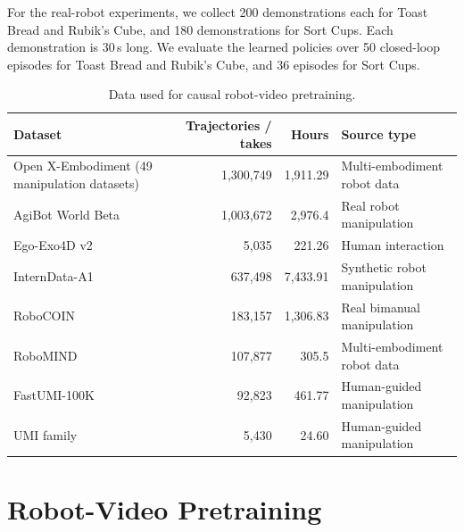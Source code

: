 For the real-robot experiments, we collect 200 demonstrations each for
Toast Bread and Rubik's Cube, and 180 demonstrations for Sort Cups.
Each demonstration is 30\,s long. We evaluate the learned
policies over 50 closed-loop episodes for Toast Bread and Rubik's Cube,
and 36 episodes for Sort Cups.




\begin{table}[t]
    \centering
    \caption{
    Data used for causal robot-video pretraining. 
    }
    \label{tab:pretraining-corpus}
    \small
    \begin{tabular}{@{}lrrl@{}}
        \toprule
        \textbf{Dataset}
        & \textbf{Trajectories / takes}
        & \textbf{Hours}
        & \textbf{Source type} \\
        \midrule

        Open X-Embodiment (49 manipulation datasets)
        & 1,300,749
        & 1,911.29
        & Multi-embodiment robot data \\

        AgiBot World Beta
        & 1,003,672
        & 2,976.4
        & Real robot manipulation \\

        Ego-Exo4D v2
        & 5,035
        & 221.26
        & Human interaction \\

        InternData-A1
        & 637,498
        & 7,433.91
        & Synthetic robot manipulation \\

        RoboCOIN
        & 183,157
        & 1,306.83
        & Real bimanual manipulation \\

        RoboMIND
        & 107,877
        & 305.5
        & Multi-embodiment robot data \\

        FastUMI-100K
        & 92,823
        & 461.77
        & Human-guided manipulation \\

        UMI family
        & 5,430
        & 24.60
        & Human-guided manipulation \\

        \bottomrule
    \end{tabular}
\end{table}

\section{Robot-Video Pretraining}
\label{app:video-pretraining}


